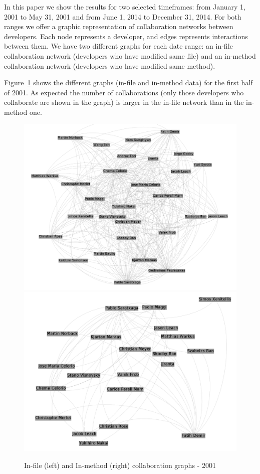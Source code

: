 \documentclass[a4paper]{article}
\begin{document}
In this paper we show the results for two selected timeframes: from January 1, 2001 to May 31, 2001 and from June 1, 2014 to December 31, 2014. For both ranges we offer a graphic representation of collaboration networks between
developers. Each node represents a developer, and edges represents
interactions between them. We have two different graphs for each date range: an in-file collaboration network (developers who have modified same file) and an in-method
collaboration network (developers who have modified same method).

Figure~\ref{fig:2001} shows the different graphs (in-file and in-method data) for the
first half of 2001. As expected the number of collaborations (only those developers
who collaborate are shown in the graph) is larger in the in-file network than in
the in-method one.

\begin{figure}[h!]
\begin{center}
\includegraphics[scale=0.17]{g2001files.png} 
\includegraphics[scale=0.17]{g2001methods.png}
\caption{In-file (left) and In-method (right) collaboration graphs - 2001}
\label{fig:2001}
\end{center}
\end{figure}
\end{document}
